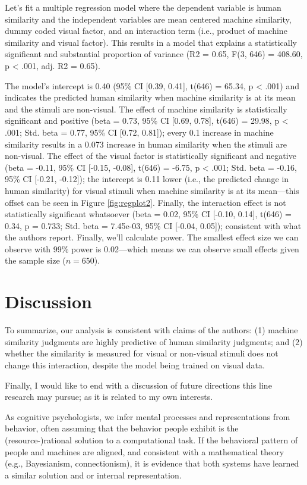 \documentclass[man]{apa7}
\begin{document}
Let's fit a multiple regression model where the dependent variable is human similarity and the independent variables are mean centered machine similarity, dummy coded visual factor, and an interaction term (i.e., product of machine similarity and visual factor). This results in a model that explains a statistically significant and substantial proportion of variance (R2 = 0.65, F(3, 646) = 408.60, p < .001, adj. R2 = 0.65).

The model's intercept is 0.40 (95\% CI [0.39, 0.41], t(646) = 65.34, p < .001) and indicates the predicted human similarity when machine similarity is at its mean and the stimuli are non-visual. The effect of machine similarity is statistically significant and positive (beta = 0.73, 95\% CI [0.69, 0.78], t(646) = 29.98, p < .001; Std. beta = 0.77, 95\% CI [0.72, 0.81]); every 0.1 increase in machine similarity results in a 0.073 increase in human similarity when the stimuli are non-visual. The effect of the visual factor is statistically significant and negative (beta = -0.11, 95\% CI [-0.15, -0.08], t(646) = -6.75, p < .001; Std. beta = -0.16, 95\% CI [-0.21, -0.12]); the intercept is 0.11 lower (i.e., the predicted change in human similarity) for visual stimuli when machine similarity is at its mean---this offset can be seen in Figure \ref{fig:regplot2}. Finally, the interaction effect is not statistically significant whatsoever (beta = 0.02, 95\% CI [-0.10, 0.14], t(646) = 0.34, p = 0.733; Std. beta = 7.45e-03, 95\% CI [-0.04, 0.05]); consistent with what the authors report. Finally, we'll calculate power. The smallest effect size we can observe with 99\% power is 0.02---which means we can observe small effects given the sample size ($n=650$).

\section{Discussion}

To summarize, our analysis is consistent with claims of the authors: (1) machine similarity judgments are highly predictive of human similarity judgments; and (2) whether the similarity is measured for visual or non-visual stimuli does not change this interaction, despite the model being trained on visual data.

Finally, I would like to end with a discussion of future directions this line research may pursue; as it is related to my own interests.

As cognitive psychologists, we infer mental processes and representations from behavior, often assuming that the behavior people exhibit is the (resource-)rational solution to a computational task. If the behavioral pattern of people and machines are aligned, and consistent with a mathematical theory (e.g., Bayesianism, connectionism), it is evidence that both systems have learned a similar solution and or internal representation. 
\end{document}
